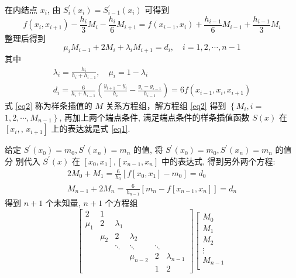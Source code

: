\documentclass[12pt,a4paper,UTF8]{ctexart}
\theoremstyle{nonumberplain}
\begin{document}
\begin{enumerate}
\begin{enumerate}
在内结点 $x_{i}$, 由 $S_{i}^{\prime}\left(x_{i}\right)=S_{i-1}^{\prime}\left(x_{i}\right)$ 可得到
\begin{equation}\label{eq2}
f\left(x_{i}, x_{i+1}\right)-\frac{h_{i}}{3} M_{i}-\frac{h_{i}}{6} M_{i+1}=f\left(x_{i-1}, x_{i}\right)+\frac{h_{i-1}}{6} M_{i-1}+\frac{h_{i-1}}{3} M_{i}
\end{equation}
整理后得到
$$
\mu_{i} M_{i-1}+2 M_{i}+\lambda_{i} M_{i+1}=d_{i}, \quad i=1,2, \cdots, n-1
$$
其中
$$
\begin{array}{c}
\lambda_{i}=\frac{h_{i}}{h_{i}+h_{i-1}}, \quad \mu_{i}=1-\lambda_{i} \\
d_{i}=\frac{6}{h_{i}+h_{i-1}}\left(\frac{y_{i+1}-y_{i}}{h_{i}}-\frac{y_{i}-y_{i-1}}{h_{i-1}}\right)=6 f\left(x_{i-1}, x_{i}, x_{i+1}\right)
\end{array}
$$
式 \ref{eq2} 称为样条插值的 $M$ 关系方程组，解方程组 \ref{eq2} 得到 $\left\{M_{i}, i=\right.$ $\left.1,2, \cdots, M_{n-1}\right\}$, 再加上两个端点条件, 满足端点条件的样条插值函数 $S(x)$ 在 $\left[x_{i},\right.$, $\left.x_{i+1}\right]$ 上的表达就是式 \ref{eq1}.
\par 给定 $S^{\prime}\left(x_{0}\right)=m_{0}, S^{\prime}\left(x_{n}\right)=m_{n}$ 的值, 将 $S^{\prime}\left(x_{0}\right)=m_{0}, S^{\prime}\left(x_{n}\right)=m_{n}$ 的值分
别代入 $S^{\prime}(x)$ 在 $\left[x_{0}, x_{1}\right],\left[x_{n-1}, x_{n}\right]$ 中的表达式, 得到另外两个方程:
$$
\begin{array}{c}
2 M_{0}+M_{1}=\frac{6}{h_{0}}\left[f\left[x_{0}, x_{1}\right]-m_{0}\right]=d_{0} \\
M_{n-1}+2 M_{n}=\frac{6}{h_{n-1}}\left[m_{n}-f\left[x_{n-1}, x_{n}\right]\right]=d_{n}
\end{array}
$$
得到 $n+1$ 个未知量, $n+1$ 个方程组
$$
\left[\begin{array}{cccccc}
2 & 1 & & & & \\
\mu _{1} & 2 & \lambda_{1} & & & \\
& \mu _{2} & 2 & \lambda_{2} & & \\
& & \ddots & \ddots & \ddots & \\
& & & \mu _{n-2} & 2 & \lambda_{n-1} \\
& & & & 1 & 2
\end{array}\right]\left[\begin{array}{c}
M_{0} \\
M_{1} \\
M_{2} \\
\vdots \\
M_{n-1} \\

\end{array}$$
\end{enumerate}
\end{enumerate}
\end{document}
